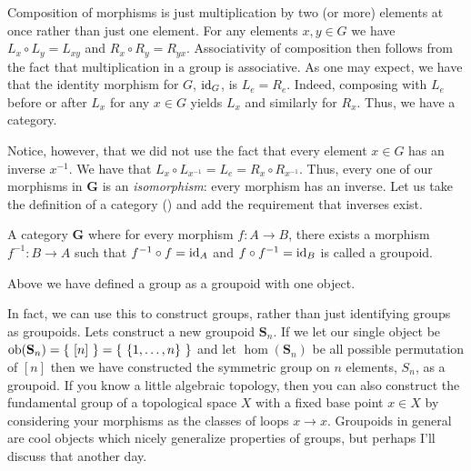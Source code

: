 \documentclass{article}
\begin{document}
Composition of morphisms is just multiplication by two (or more) elements at once rather than just one element.
For any elements $x, y \in G$ we have $L_{x} \circ L_{y} = L_{xy}$ and $R_{x} \circ R_{y} = R_{yx}$.
Associativity of composition then follows from the fact that multiplication in a group is associative.
As one may expect, we have that the identity morphism for $G$, $\operatorname{id}_{G}$, is $L_{e} = R_{e}$.
Indeed, composing with $L_{e}$ before or after $L_{x}$ for any $x \in G$ yields $L_{x}$ and similarly for $R_{x}$.
Thus, we have a category.

Notice, however, that we did not use the fact that every element $x \in G$ has an inverse $x^{-1}$.
We have that $L_{x} \circ L_{x^{-1}} = L_{e} = R_{x} \circ R_{x^{-1}}$.
Thus, every one of our morphisms in $\textbf{G}$ is an \emph{isomorphism}: every morphism has an inverse.
Let us take the definition of a category () and add the requirement that inverses exist.
\begin{defn}\label{defn:groupoid}
  A category $\textbf{G}$ where for every morphism $f\colon A \to B$, there exists a morphism $f^{-1}\colon B \to A$ such that $f^{-1} \circ f = \operatorname{id}_{A}$ and $f \circ f^{-1} = \operatorname{id}_{B}$ is called a groupoid.
\end{defn}
Above we have defined a group as a groupoid with one object.

In fact, we can use this to construct groups, rather than just identifying groups as groupoids.
Lets construct a new groupoid $\textbf{S}_{n}$.
If we let our single object be $\operatorname{ob}(\textbf{S}_{n}) = \left\{~[n]~\right\} = \left\{~\{1, \ldots, n\}~\right\}$ and let $\hom(\textbf{S}_{n})$ be all possible permutation of $[n]$ then we have constructed the symmetric group on $n$ elements, $S_{n}$, as a groupoid.
If you know a little algebraic topology, then you can also construct the fundamental group of a topological space $X$ with a fixed base point $x \in X$ by considering your morphisms as the classes of loops $x \to x$.
Groupoids in general are cool objects which nicely generalize properties of groups, but perhaps I'll discuss that another day.
\end{document}
